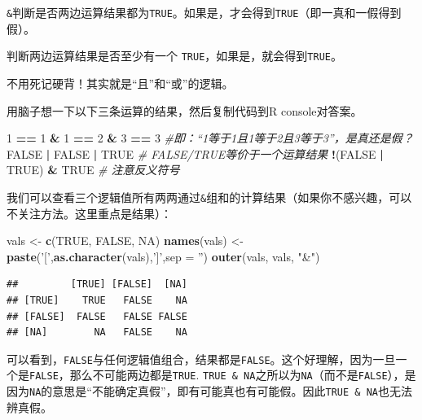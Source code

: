 \documentclass[]{book}
\newenvironment{Shaded}{\begin{snugshade}}{\end{snugshade}}
\newcommand{\CommentTok}[1]{\textcolor[rgb]{0.56,0.35,0.01}{\textit{#1}}}
\newcommand{\DataTypeTok}[1]{\textcolor[rgb]{0.13,0.29,0.53}{#1}}
\newcommand{\DecValTok}[1]{\textcolor[rgb]{0.00,0.00,0.81}{#1}}
\newcommand{\KeywordTok}[1]{\textcolor[rgb]{0.13,0.29,0.53}{\textbf{#1}}}
\newcommand{\NormalTok}[1]{#1}
\newcommand{\OperatorTok}[1]{\textcolor[rgb]{0.81,0.36,0.00}{\textbf{#1}}}
\newcommand{\OtherTok}[1]{\textcolor[rgb]{0.56,0.35,0.01}{#1}}
\newcommand{\StringTok}[1]{\textcolor[rgb]{0.31,0.60,0.02}{#1}}
\begin{document}
\texttt{\&}判断是否两边运算结果都为\texttt{TRUE}。如果是，才会得到\texttt{TRUE}（即一真和一假得到假）。

\texttt{\textbar{}}判断两边运算结果是否至少有一个 \texttt{TRUE}，如果是，就会得到\texttt{TRUE}。

不用死记硬背！其实就是``且''和``或''的逻辑。

用脑子想一下以下三条运算的结果，然后复制代码到R console对答案。

\begin{Shaded}
\begin{Highlighting}[]
\DecValTok{1} \OperatorTok{==}\StringTok{ }\DecValTok{1} \OperatorTok{&}\StringTok{ }\DecValTok{1} \OperatorTok{==}\StringTok{ }\DecValTok{2} \OperatorTok{&}\StringTok{ }\DecValTok{3} \OperatorTok{==}\StringTok{ }\DecValTok{3} \CommentTok{#即：“1等于1且1等于2且3等于3”，是真还是假？}
\OtherTok{FALSE} \OperatorTok{|}\StringTok{ }\OtherTok{FALSE} \OperatorTok{|}\StringTok{ }\OtherTok{TRUE} \CommentTok{# FALSE/TRUE等价于一个运算结果}
\OperatorTok{!}\NormalTok{(}\OtherTok{FALSE} \OperatorTok{|}\StringTok{ }\OtherTok{TRUE}\NormalTok{) }\OperatorTok{&}\StringTok{ }\OtherTok{TRUE} \CommentTok{# 注意反义符号}
\end{Highlighting}
\end{Shaded}

我们可以查看三个逻辑值所有两两通过\texttt{\&}组和的计算结果（如果你不感兴趣，可以不关注方法。这里重点是结果）：

\begin{Shaded}
\begin{Highlighting}[]
\NormalTok{vals <-}\StringTok{ }\KeywordTok{c}\NormalTok{(}\OtherTok{TRUE}\NormalTok{, }\OtherTok{FALSE}\NormalTok{, }\OtherTok{NA}\NormalTok{) }
\KeywordTok{names}\NormalTok{(vals) <-}\StringTok{ }\KeywordTok{paste}\NormalTok{(}\StringTok{'['}\NormalTok{,}\KeywordTok{as.character}\NormalTok{(vals),}\StringTok{']'}\NormalTok{,}\DataTypeTok{sep =} \StringTok{''}\NormalTok{)}
\KeywordTok{outer}\NormalTok{(vals, vals, }\StringTok{"&"}\NormalTok{)}
\end{Highlighting}
\end{Shaded}

\begin{verbatim}
##         [TRUE] [FALSE]  [NA]
## [TRUE]    TRUE   FALSE    NA
## [FALSE]  FALSE   FALSE FALSE
## [NA]        NA   FALSE    NA
\end{verbatim}

可以看到，\texttt{FALSE}与任何逻辑值组合，结果都是\texttt{FALSE}。这个好理解，因为一旦一个是\texttt{FALSE}，那么不可能两边都是\texttt{TRUE}. \texttt{TRUE\ \&\ NA}之所以为\texttt{NA}（而不是\texttt{FALSE}），是因为\texttt{NA}的意思是``不能确定真假''，即有可能真也有可能假。因此\texttt{TRUE\ \&\ NA}也无法辨真假。
\end{document}
